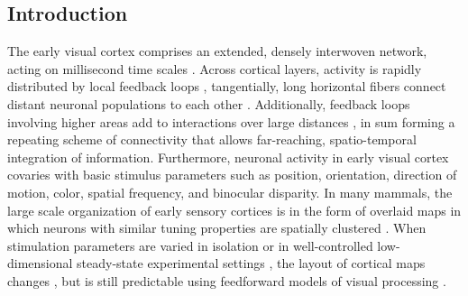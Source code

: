 \subsection{Introduction}


The early visual cortex comprises an extended, densely interwoven network,
acting on millisecond time scales \citep{callaway1998a}. Across cortical
layers, activity is rapidly distributed by local feedback loops
\citep{tucker2003a,douglas2007a}, tangentially, long horizontal fibers
connect distant neuronal populations to each other \citep{gilbert1989a,
kisvarday1994a, grinvald1994a, bringuier1999a, jancke2004a}. Additionally,
feedback loops involving higher areas add to interactions over large
distances \citep{bullier2001a}, in sum forming a repeating scheme of
connectivity that allows far-reaching, spatio-temporal integration of
information. Furthermore, neuronal activity in early visual cortex covaries
with basic stimulus parameters such as position, orientation, direction of
motion, color, spatial frequency, and binocular disparity. In many mammals,
the large scale organization of early sensory cortices is in the form of
overlaid maps in which neurons with similar tuning properties are spatially
clustered \citep{hubel1974b, blasdel1986a, bonhoeffer1991a, hubener1997a,
coppola1998b}. When stimulation parameters are varied in isolation or in
well-controlled low-dimensional steady-state experimental settings
\citep{jancke2000a, geisler2007a, benucci2007a}, the layout of cortical
maps changes \citep{basole2003a}, but is still predictable using
feedforward models of visual processing \citep{mante2005b}. 
 
